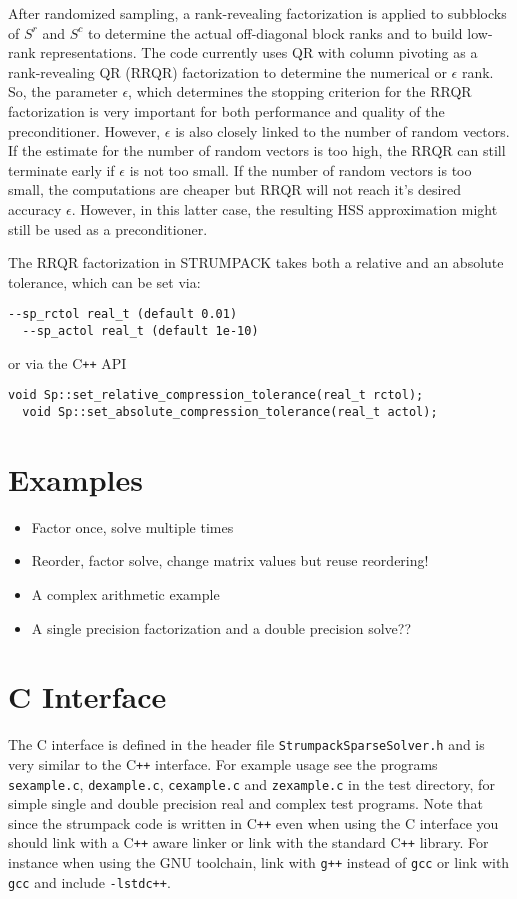 \documentclass{article}
\begin{document}
After randomized sampling, a rank-revealing factorization is applied
to subblocks of $S^r$ and $S^c$ to determine the actual off-diagonal
block ranks and to build low-rank representations. The code currently
uses QR with column pivoting as a rank-revealing QR (RRQR)
factorization to determine the numerical or $\epsilon$ rank. So, the
parameter $\epsilon$, which determines the stopping criterion for the
RRQR factorization is very important for both performance and quality
of the preconditioner. However, $\epsilon$ is also closely linked to
the number of random vectors. If the estimate for the number of random
vectors is too high, the RRQR can still terminate early if $\epsilon$
is not too small. If the number of random vectors is too small, the
computations are cheaper but RRQR will not reach it's desired accuracy
$\epsilon$. However, in this latter case, the resulting HSS
approximation might still be used as a preconditioner.

The RRQR factorization in STRUMPACK takes both a relative and an
absolute tolerance, which can be set via:
\begin{lstlisting}[style=Bash]
  --sp_rctol real_t (default 0.01)
  --sp_actol real_t (default 1e-10)
\end{lstlisting}
or via the C\texttt{++} API
\begin{lstlisting}[style=C]
  void Sp::set_relative_compression_tolerance(real_t rctol);
  void Sp::set_absolute_compression_tolerance(real_t actol);
\end{lstlisting}


\section{Examples}\label{sec:examples}
\begin{itemize}
\item Factor once, solve multiple times
\item Reorder, factor solve, change matrix values but reuse reordering!
\item A complex arithmetic example
\item A single precision factorization and a double precision solve??
\end{itemize}

\section{C Interface} \label{sec:Cinterface} The C interface is
defined in the header file
\lstinline[style=C]!StrumpackSparseSolver.h! and is very similar to
the C\texttt{++} interface. For example usage see the programs
\lstinline[style=C]!sexample.c!, \lstinline[style=C]!dexample.c!,
\lstinline[style=C]!cexample.c! and \lstinline[style=C]!zexample.c!
in the test directory, for simple single and double precision real and
complex test programs. Note that since the strumpack code is written
in C\texttt{++} even when using the C interface you should link with a
C\texttt{++} aware linker or link with the standard C\texttt{++}
library. For instance when using the GNU toolchain, link with
\texttt{g++} instead of \texttt{gcc} or link with \texttt{gcc} and
include \texttt{-lstdc++}.
\end{document}

